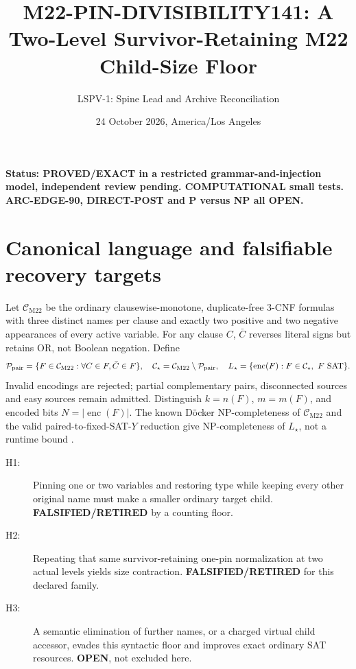\documentclass[11pt]{article}
\title{M22-PIN-DIVISIBILITY141: A Two-Level Survivor-Retaining M22 Child-Size Floor}
\author{LSPV-1: Spine Lead and Archive Reconciliation}
\date{24 October 2026, America/Los Angeles}
\newcommand{\CM}{\mathcal C_{\mathrm{M22}}}
\newcommand{\CS}{\mathcal C_\star}
\begin{document}
\maketitle
\noindent\textbf{Status: PROVED/EXACT in a restricted grammar-and-injection model, independent review pending. COMPUTATIONAL small tests. ARC-EDGE-90, DIRECT-POST and P versus NP all OPEN.}

\section{Canonical language and falsifiable recovery targets}
Let \(\CM\) be the ordinary clausewise-monotone, duplicate-free 3-CNF formulas with three distinct names per clause and exactly two positive and two negative appearances of every active variable. For any clause \(C\), \(\bar C\) reverses literal signs but retains OR, not Boolean negation. Define
\[
\mathcal P_{\rm pair}=\{F\in\CM:\forall C\in F,\bar C\in F\},\quad
\CS=\CM\setminus\mathcal P_{\rm pair},\quad
L_\star=\{\operatorname{enc}(F):F\in\CS,\ F\text{ SAT}\}.
\]
Invalid encodings are rejected; partial complementary pairs, disconnected sources and easy sources remain admitted. Distinguish \(k=n(F)\), \(m=m(F)\), and encoded bits \(N=|\operatorname{enc}(F)|\). The known D\"ocker NP-completeness of \(\CM\) and the valid paired-to-fixed-SAT-\(Y\) reduction give NP-completeness of \(L_\star\), not a runtime bound \cite{docker}.
\begin{description}
\item[H1:] Pinning one or two variables and restoring type while keeping every other original name must make a smaller ordinary target child. \textbf{FALSIFIED/RETIRED} by a counting floor.
\item[H2:] Repeating that same survivor-retaining one-pin normalization at two actual levels yields size contraction. \textbf{FALSIFIED/RETIRED} for this declared family.
\item[H3:] A semantic elimination of further names, or a charged virtual child accessor, evades this syntactic floor and improves exact ordinary SAT resources. \textbf{OPEN}, not excluded here.
\end{description}
\end{document}
